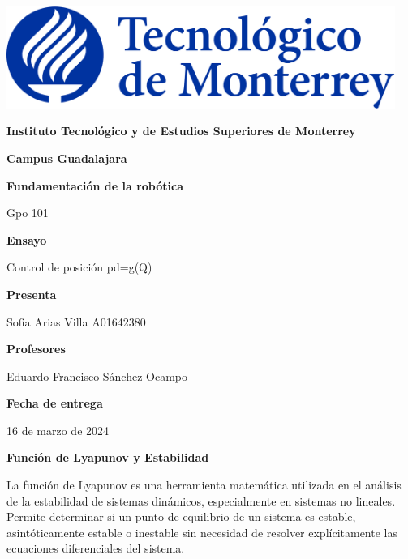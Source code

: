 \documentclass[fleqn,letterpaper,12pt]{article}
\title{}
\author{}
\date{}
\begin{document}
\begin{titlepage}
    \centering
    \includegraphics[width=0.95\textwidth]{tecnologico-de-monterrey-blue.png} %
    \vspace{1cm}

    {\textbf{Instituto Tecnológico y de Estudios Superiores de Monterrey}\par}
    {\textbf{Campus Guadalajara}\par}
    \vspace{1cm}

    {\textbf{Fundamentación de la robótica}\par}
    {\large Gpo 101\par}
    \vspace{1cm}

    {\textbf{Ensayo}\par}
    {\large Control de posición pd=g(Q)\par}
    \vspace{1cm}

    {\textbf{Presenta}\par}
    Sofia Arias Villa \hspace{3cm} A01642380
    \vspace{1cm}

    {\textbf{Profesores}\par}
    Eduardo Francisco Sánchez Ocampo
    \vspace{1cm}

    {\textbf{Fecha de entrega}\par}
    16 de marzo de 2024

\end{titlepage}

\textbf{Función de Lyapunov y Estabilidad}

La función de Lyapunov es una herramienta matemática utilizada en el análisis de la estabilidad de sistemas dinámicos, especialmente en sistemas no lineales. Permite determinar si un punto de equilibrio de un sistema es estable, asintóticamente estable o inestable sin necesidad de resolver explícitamente las ecuaciones diferenciales del sistema.
\end{document}
